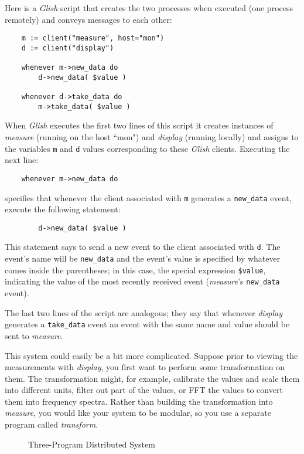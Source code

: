 Here is a {\em Glish} script that creates the two processes when
executed (one process remotely) and conveys  messages to each
other:
\begin{verbatim}
    m := client("measure", host="mon")
    d := client("display")

    whenever m->new_data do
        d->new_data( $value )

    whenever d->take_data do
        m->take_data( $value )
\end{verbatim}
When {\em Glish} executes the first two lines of this script it creates instances
of {\em measure} (running on the host ``mon") and {\em display} (running
locally) and assigns to the variables {\tt m} and {\tt d} values
corresponding to these {\em Glish} clients.  Executing the next line:
\begin{verbatim}
    whenever m->new_data do
\end{verbatim}
specifies that whenever the client associated with {\tt m}
generates a {\tt new\_data} event, execute the following statement:
\begin{verbatim}
        d->new_data( $value )
\end{verbatim}
This statement says to send a new event to the client associated with {\tt d}.
The event's name will be {\tt new\_data} and the event's value
is specified by whatever comes inside the parentheses; in this case,
the special expression {\tt \$value}, indicating the
value of the most recently received event ({\em measure\/}'s
{\tt new\_data} event).

The last two lines of the script are analogous; they say that whenever
{\em display} generates a {\tt take\_data} event an event with the
same name and value should be sent to {\em measure\/}.

This system could easily be a bit more complicated.  Suppose prior to
viewing the measurements with {\em display}, you first want to perform some
transformation on them.  The transformation might, for example, calibrate the
values and scale them into different units, filter out part of the values,
or FFT the values to convert them into frequency spectra.  Rather than
building the transformation into {\em measure\/}, you would like your
system to be modular,
so you use a separate program called {\em transform\/}.

\begin{figure}[thb]
\centerline{}
\caption{ Three-Program Distributed System }
\label{ex2}
\end{figure}

